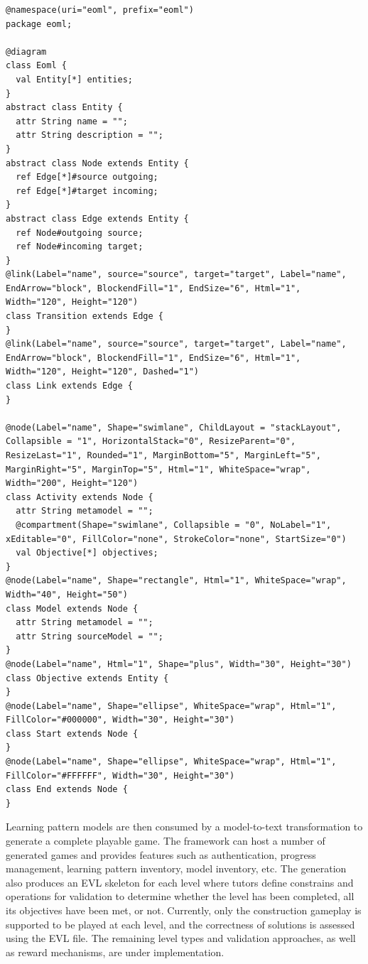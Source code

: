 \documentclass[conference]{IEEEtran}
\begin{document}
\begin{lstlisting}[style=interfaces,caption={The annotated metamodel of learning pattern modelling language.},label=pattern-metamodel]
@namespace(uri="eoml", prefix="eoml")
package eoml;

@diagram
class Eoml {
  val Entity[*] entities;
}
abstract class Entity {
  attr String name = "";
  attr String description = "";
}
abstract class Node extends Entity {
  ref Edge[*]#source outgoing;
  ref Edge[*]#target incoming;
}
abstract class Edge extends Entity {
  ref Node#outgoing source;
  ref Node#incoming target;
}
@link(Label="name", source="source", target="target", Label="name", EndArrow="block", BlockendFill="1", EndSize="6", Html="1", Width="120", Height="120")
class Transition extends Edge {
}
@link(Label="name", source="source", target="target", Label="name", EndArrow="block", BlockendFill="1", EndSize="6", Html="1", Width="120", Height="120", Dashed="1")
class Link extends Edge {
}

@node(Label="name", Shape="swimlane", ChildLayout = "stackLayout", Collapsible = "1", HorizontalStack="0", ResizeParent="0", ResizeLast="1", Rounded="1", MarginBottom="5", MarginLeft="5", MarginRight="5", MarginTop="5", Html="1", WhiteSpace="wrap", Width="200", Height="120")
class Activity extends Node {
  attr String metamodel = "";
  @compartment(Shape="swimlane", Collapsible = "0", NoLabel="1", xEditable="0", FillColor="none", StrokeColor="none", StartSize="0")
  val Objective[*] objectives;
}
@node(Label="name", Shape="rectangle", Html="1", WhiteSpace="wrap", Width="40", Height="50")
class Model extends Node {
  attr String metamodel = "";
  attr String sourceModel = "";
}
@node(Label="name", Html="1", Shape="plus", Width="30", Height="30")
class Objective extends Entity {
}
@node(Label="name", Shape="ellipse", WhiteSpace="wrap", Html="1", FillColor="#000000", Width="30", Height="30")
class Start extends Node {
}
@node(Label="name", Shape="ellipse", WhiteSpace="wrap", Html="1", FillColor="#FFFFFF", Width="30", Height="30")
class End extends Node {
}
\end{lstlisting} 

Learning pattern models are then consumed by a model-to-text transformation to generate a complete playable game. The framework can host a number of generated games and provides features such as authentication, progress management, learning pattern inventory, model inventory, etc. The generation also produces an EVL \cite{kolovos2006eclipse} skeleton for each level where tutors define constrains and operations for validation to determine whether the level has been completed, all its objectives have been met, or not. Currently, only the construction gameplay is supported to be played at each level, and the correctness of solutions is assessed using the EVL file. The remaining level types and validation approaches, as well as reward mechanisms,  are under implementation. 
\end{document}

